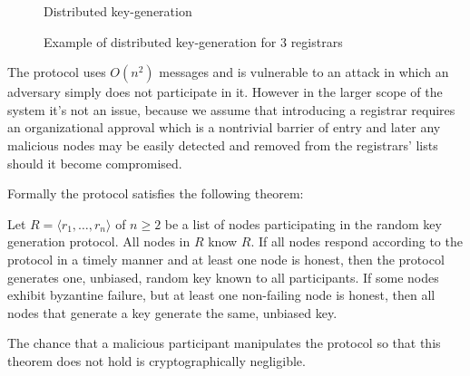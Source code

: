 \begin{figure}[tbp]
\begin{msc}{Distributed key-generation}
\setlength{\instdist}{5.5cm}
\setlength{\envinstdist}{3cm}
\nextlevel[5]
\nextlevel[2]
\nextlevel[2]
\nextlevel[2]
\nextlevel[2]
\nextlevel[2]
\nextlevel[2]
\nextlevel[2]
\nextlevel[2]
\nextlevel[2]
\nextlevel[4]
\end{msc}
\caption{Example of distributed key-generation for 3 registrars}
\label{fig:key_gen_example}
\end{figure}

The protocol uses $O\left(n^2\right)$ messages and is vulnerable to an attack in
which an adversary simply does not participate in it.
However in the larger scope of the system it's not an issue, because we assume
that introducing a registrar requires an organizational approval which is a
nontrivial barrier of entry and later any malicious nodes may be easily detected
and removed from the registrars' lists should it become compromised.

Formally the protocol satisfies the following theorem:

\begin{theorem}
  Let $R = \langle r_1, \ldots, r_n \rangle$ of $n \geq 2$ be a list of nodes
  participating in the random key generation protocol. All nodes in $R$ know
  $R$. 
  If all nodes respond according to the protocol in a timely manner and at least
  one node is honest, then the protocol generates one, unbiased, random key known
  to all participants.
  If some nodes exhibit byzantine failure, but at least one non-failing node is
  honest, then all nodes that generate a key generate the same, unbiased key.

  The chance that a malicious participant manipulates the protocol so that this
  theorem does not hold is cryptographically negligible.
  \label{th:robust_distributed_key_generation}
\end{theorem}

